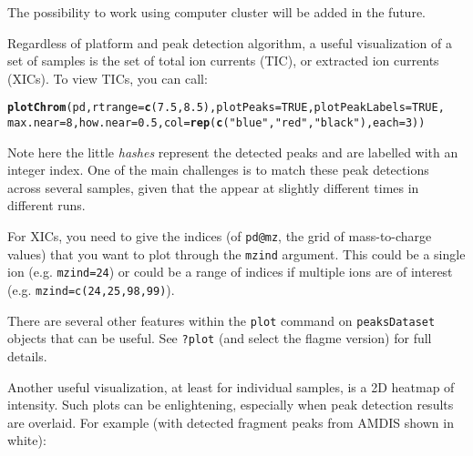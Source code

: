 \documentclass{article}\usepackage[]{graphicx}\usepackage[]{color}
\makeatletter
\newcommand{\hlnum}[1]{\textcolor[rgb]{0.686,0.059,0.569}{#1}}%
\newcommand{\hlstr}[1]{\textcolor[rgb]{0.192,0.494,0.8}{#1}}%
\newcommand{\hlstd}[1]{\textcolor[rgb]{0.345,0.345,0.345}{#1}}%
\newcommand{\hlkwc}[1]{\textcolor[rgb]{0.333,0.667,0.333}{#1}}%
\newcommand{\hlkwd}[1]{\textcolor[rgb]{0.737,0.353,0.396}{\textbf{#1}}}%
\newenvironment{kframe}{%
 \def\at@end@of@kframe{}%
 \ifinner\ifhmode%
  \def\at@end@of@kframe{\end{minipage}}%
  \begin{minipage}{\columnwidth}%
 \fi\fi%
 \def\FrameCommand##1{\hskip\@totalleftmargin \hskip-\fboxsep
 \colorbox{shadecolor}{##1}\hskip-\fboxsep
     \hskip-\linewidth \hskip-\@totalleftmargin \hskip\columnwidth}%
 \MakeFramed {\advance\hsize-\width
   \@totalleftmargin\z@ \linewidth\hsize
   \@setminipage}}%
 {\par\unskip\endMakeFramed%
 \at@end@of@kframe}
\newenvironment{knitrout}{}{} %
\makeatother
\begin{document}
The possibility to work using computer cluster will be added in the future. 

Regardless of platform and peak detection algorithm, a useful
visualization of a set of samples is the set of total ion currents
(TIC), or extracted ion currents (XICs). To view TICs, you can call:

\begin{knitrout}
\color{fgcolor}\begin{kframe}
\begin{alltt}
\hlkwd{plotChrom}\hlstd{(pd,} \hlkwc{rtrange}\hlstd{=}\hlkwd{c}\hlstd{(}\hlnum{7.5}\hlstd{,}\hlnum{8.5}\hlstd{),} \hlkwc{plotPeaks}\hlstd{=}\hlnum{TRUE}\hlstd{,} \hlkwc{plotPeakLabels}\hlstd{=}\hlnum{TRUE}\hlstd{,}
     \hlkwc{max.near}\hlstd{=}\hlnum{8}\hlstd{,} \hlkwc{how.near}\hlstd{=}\hlnum{0.5}\hlstd{,} \hlkwc{col}\hlstd{=}\hlkwd{rep}\hlstd{(}\hlkwd{c}\hlstd{(}\hlstr{"blue"}\hlstd{,}\hlstr{"red"}\hlstd{,}\hlstr{"black"}\hlstd{),} \hlkwc{each}\hlstd{=}\hlnum{3}\hlstd{))}
\end{alltt}


{\ttfamily\noindent\bfseries{}}\end{kframe}
\end{knitrout}

Note here the little {\em hashes} represent the detected peaks and are
labelled with an integer index. One of the main challenges is to match
these peak detections across several samples, given that the appear at
slightly different times in different runs.

For XICs, you need to give the indices (of \texttt{pd@mz}, the grid of
mass-to-charge values) that you want to plot through the
\texttt{mzind} argument.  This could be a single ion
(e.g. \texttt{mzind=24}) or could be a range of indices if multiple
ions are of interest (e.g. \texttt{mzind=c(24,25,98,99)}). 

There are several other features within the \texttt{plot} command on
\texttt{peaksDataset} objects that can be useful. See \texttt{?plot}
(and select the flagme version) for full details. 

Another useful visualization, at least for individual samples, is a 2D
heatmap of intensity. Such plots can be enlightening, especially when
peak detection results are overlaid. For example (with detected
fragment peaks from AMDIS shown in white): 
\end{document}
